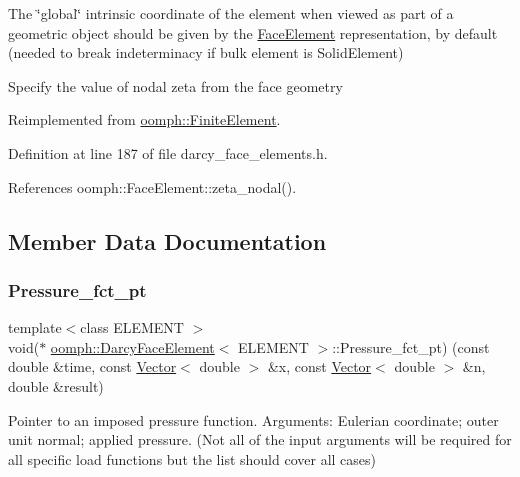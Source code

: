 The \char`\"{}global\char`\"{} intrinsic coordinate of the element when viewed as part of a geometric object should be given by the \hyperlink{classoomph_1_1FaceElement}{Face\+Element} representation, by default (needed to break indeterminacy if bulk element is Solid\+Element) 

Specify the value of nodal zeta from the face geometry 

Reimplemented from \hyperlink{classoomph_1_1FiniteElement_a849561c5fbcbc07dc49d2dc6cca68559}{oomph\+::\+Finite\+Element}.



Definition at line 187 of file darcy\+\_\+face\+\_\+elements.\+h.



References oomph\+::\+Face\+Element\+::zeta\+\_\+nodal().



\subsection{Member Data Documentation}
\mbox{\label{classoomph_1_1DarcyFaceElement_a39c6156b3067d3ff047eb7cf62d36b4c}} 
\subsubsection{\texorpdfstring{Pressure\+\_\+fct\+\_\+pt}{Pressure\_fct\_pt}}
{\footnotesize\ttfamily template$<$class E\+L\+E\+M\+E\+NT $>$ \\
void($\ast$ \hyperlink{classoomph_1_1DarcyFaceElement}{oomph\+::\+Darcy\+Face\+Element}$<$ E\+L\+E\+M\+E\+NT $>$\+::Pressure\+\_\+fct\+\_\+pt) (const double \&time, const \hyperlink{classoomph_1_1Vector}{Vector}$<$ double $>$ \&x, const \hyperlink{classoomph_1_1Vector}{Vector}$<$ double $>$ \&n, double \&result)\hspace{0.3cm}{\ttfamily [protected]}}



Pointer to an imposed pressure function. Arguments\+: Eulerian coordinate; outer unit normal; applied pressure. (Not all of the input arguments will be required for all specific load functions but the list should cover all cases) 




